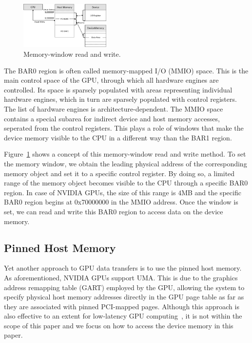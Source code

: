 \begin{figure}[!t]
 \centering
 \includegraphics[width=0.4\textwidth]{figure/Method/MEMWND_Method.pdf}
 \caption{Memory-window read and write.}
 \label{fig:memwnd}
\end{figure}

The BAR0 region is often called memory-mapped I/O (MMIO) space.
This is the main control space of the GPU, through which all hardware
engines are controlled.
Its space is sparsely populated with areas representing individual
hardware engines, which in turn are sparsely populated with control
registers.
The list of hardware engines is architecture-dependent.
The MMIO space contains a special subarea for indirect device and host
memory accesses, seperated from the control registers.
This plays a role of windows that make the device memory visible to the
CPU in a different way than the BAR1 region.

Figure~\ref{fig:memwnd} shows a concept of this memory-window read and
write method.
To set the memory window, we obtain the leading physical address of the
corresponding memory object and set it to a specific control register.
By doing so, a limited range of the memory object becomes visible to the
CPU through a specific BAR0 region.
In case of NVIDIA GPUs, the size of this range is $4$MB and the specific
BAR0 region begins at 0x70000000 in the MMIO address.
Once the window is set, we can read and write this BAR0 region to access
data on the device memory.

\subsection{Pinned Host Memory}

Yet another approach to GPU data transfers is to use the pinned host
memory.
As aforementioned, NVIDIA GPUs support UMA.
This is due to the graphics address remapping table (GART) employed by
the GPU, allowing the system to specify physical host memory addresses
directly in the GPU page table as far as they are associated with pinned
PCI-mapped pages.
Although this approach is also effective to an extent for low-latency
GPU computing~\cite{Kato_ICCPS13}, it is not within the scope of this
paper and we focus on how to access the device memory in this paper.
